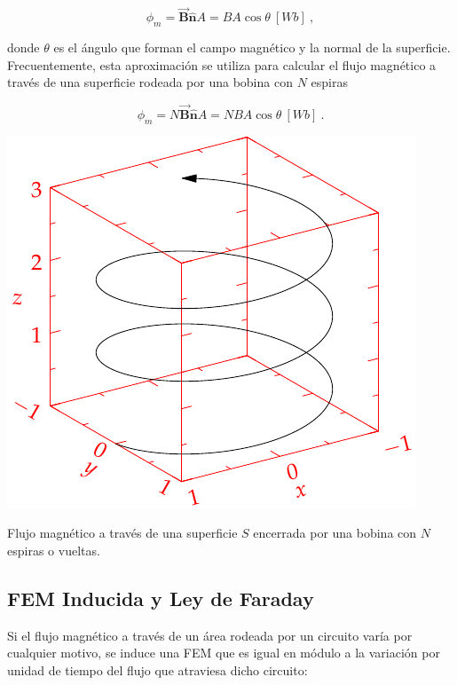 \documentclass{tufte-handout}
\begin{document}
\begin{equation}
\phi_m = \mathbf{\vec{B}}\mathbf{\hat{n}}A = BA\cos{\theta} ~ [Wb]~,
\end{equation}

donde $\theta$ es el ángulo que forman el campo magnético y la normal de la superficie. Frecuentemente, esta aproximación se utiliza para calcular el flujo magnético a través de una superficie rodeada por una bobina con $N$ espiras

\begin{equation}
\phi_m = N\mathbf{\vec{B}}\mathbf{\hat{n}}A = NBA\cos{\theta} ~ [Wb]~.
\end{equation}

\begin{marginfigure}%
    \includegraphics[width=\linewidth]{helix}
    \caption{Flujo magnético a través de una superficie $S$ encerrada por una bobina con $N$ espiras o vueltas.}
    \label{fig:flujomagneticoespira}
\end{marginfigure}

\subsection{FEM Inducida y Ley de Faraday}

Si el flujo magnético a través de un área rodeada por un circuito varía por cualquier motivo, se induce una FEM que es igual en módulo a la variación por unidad de tiempo del flujo que atraviesa dicho circuito:
\end{document}
